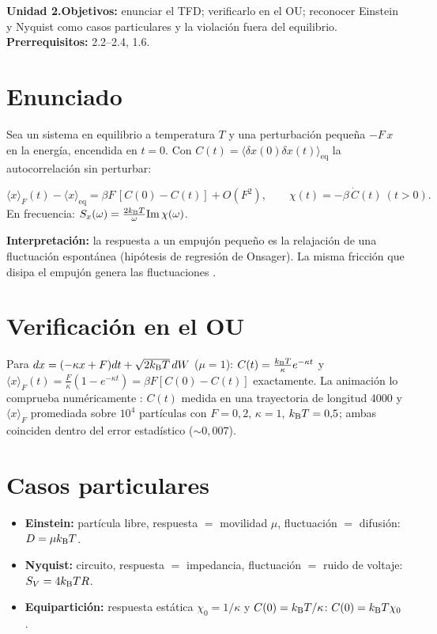 \documentclass[11pt,a4paper]{article}
\begin{document}

\noindent\textbf{Unidad 2.}\quad\textbf{Objetivos:} enunciar el TFD; verificarlo en el OU; reconocer Einstein y Nyquist como
casos particulares y la violación fuera del equilibrio. \textbf{Prerrequisitos:} 2.2--2.4, 1.6.

\section{Enunciado}
Sea un sistema en equilibrio a temperatura $T$ y una perturbación pequeña $-F\,x$ en la energía, encendida en $t=0$.
Con $C(t)=\langle\delta x(0)\delta x(t)\rangle_{\text{eq}}$ la autocorrelación sin perturbar:
\begin{resultado}
\begin{equation}\langle x\rangle_F(t)-\langle x\rangle_{\text{eq}}=\beta F\,[C(0)-C(t)]+O(F^2),\qquad\chi(t)=-\beta\,\dot C(t)\ (t>0).\end{equation}
En frecuencia: $S_x(\omega)=\frac{2k_{\mathrm B} T}{\omega}\mathrm{Im}\,\chi(\omega)$.
\end{resultado}
\textbf{Interpretación:} la respuesta a un empujón pequeño es la relajación de una fluctuación espontánea (hipótesis de
regresión de Onsager). La misma fricción que disipa el empujón genera las fluctuaciones \cite{peliti,seifert}.

\section{Verificación en el OU}
Para $dx=(-\kappa x+F)dt+\sqrt{2k_{\mathrm B} T}\,dW$ ($\mu=1$): $C(t)=\frac{k_{\mathrm B} T}{\kappa}e^{-\kappa t}$ y
$\langle x\rangle_F(t)=\frac{F}{\kappa}(1-e^{-\kappa t})=\beta F[C(0)-C(t)]$ exactamente. La animación lo comprueba
numéricamente \evS: $C(t)$ medida en una trayectoria de longitud 4000 y $\langle x\rangle_F$ promediada sobre $10^4$
partículas con $F=0{,}2$, $\kappa=1$, $k_{\mathrm B} T=0{,}5$; ambas coinciden dentro del error estadístico ($\sim0{,}007$).

\section{Casos particulares}
\begin{itemize}[nosep]
\item \textbf{Einstein:} partícula libre, respuesta $=$ movilidad $\mu$, fluctuación $=$ difusión: $D=\mu k_{\mathrm B} T$.
\item \textbf{Nyquist:} circuito, respuesta $=$ impedancia, fluctuación $=$ ruido de voltaje: $S_V=4k_{\mathrm B} TR$.
\item \textbf{Equipartición:} respuesta estática $\chi_0=1/\kappa$ y $C(0)=k_{\mathrm B} T/\kappa$: $C(0)=k_{\mathrm B} T\chi_0$.
\end{itemize}
\end{document}
